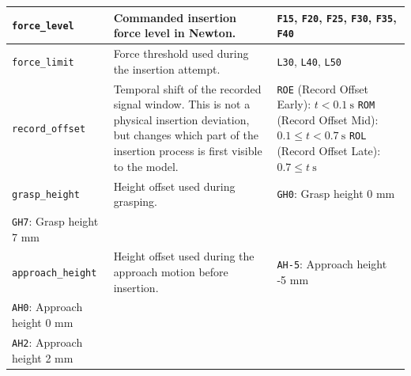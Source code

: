 \begin{table}[htbp]
\begin{tabular}{p{} p{} p{}}
        \midrule

        \texttt{force\_level} 
        & Commanded insertion force level in Newton.
        & \texttt{F15}, \texttt{F20}, \texttt{F25}, \texttt{F30}, \texttt{F35}, \texttt{F40} \\

        \midrule

        \texttt{force\_limit} 
        & Force threshold used during the insertion attempt.
        & \texttt{L30}, \texttt{L40}, \texttt{L50} \\

        \midrule

        \texttt{record\_offset} 
        & Temporal shift of the recorded signal window. This is not a physical insertion deviation, but changes which part of the insertion process is first visible to the model.
        & \texttt{ROE} (Record Offset Early): $t < 0.1~\mathrm{s}$ \newline
          \texttt{ROM} (Record Offset Mid): $0.1 \leq t < 0.7~\mathrm{s}$ \newline
          \texttt{ROL} (Record Offset Late): $0.7 \leq t~\mathrm{s}$ \\

        \midrule

        \texttt{grasp\_height} 
        & Height offset used during grasping.
        & \texttt{GH0}: Grasp height 0 mm\\
        \texttt{GH7}: Grasp height 7 mm\\

        \midrule

        \texttt{approach\_height} 
        & Height offset used during the approach motion before insertion.
        & \texttt{AH-5}: Approach height -5 mm\\
        \texttt{AH0}: Approach height 0 mm\\
        \texttt{AH2}: Approach height 2 mm\\

        \bottomrule
    \end{tabular}
\end{table}

